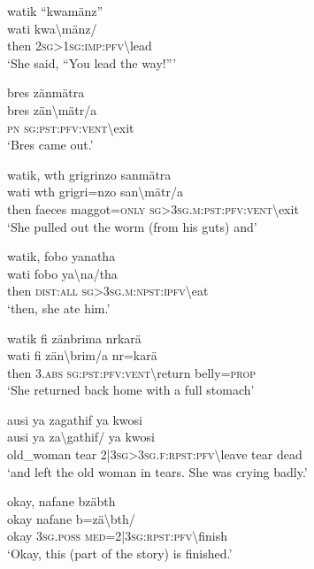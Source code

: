 \ea\label{ex:8:a1795}
watik ``kwamänz''\\
\gll wati	kwa{\textbackslash}mänz/\\
     then	2\textsc{sg}>1\textsc{sg}:\textsc{imp}:\textsc{pfv}{\textbackslash}lead\\
\glt `She said, ``You lead the way!'''
\z

\ea\label{ex:8:a1797}
bres zänmätra\\
\gll bres	zän{\textbackslash}mätr/a\\
     \textsc{pn}	\textsc{sg}:\textsc{pst}:\textsc{pfv}:\textsc{vent}{\textbackslash}exit\\
\glt `Bres came out.'
\z

\ea\label{ex:8:a1798}
watik, wth grigrinzo sanmätra\\
\gll wati	wth	grigri=nzo	san{\textbackslash}mätr/a\\
     then	faeces	maggot=\textsc{only}	\textsc{sg}>3\textsc{sg}.\textsc{m}:\textsc{pst}:\textsc{pfv}:\textsc{vent}{\textbackslash}exit\\
\glt `She pulled out the worm (from his guts) and'
\z

\ea\label{ex:8:a1799}
watik, fobo yanatha\\
\gll wati	fobo	ya{\textbackslash}na/tha\\
     then	\textsc{dist}:\textsc{all}	\textsc{sg}>3\textsc{sg}.\textsc{m}:\textsc{npst}:\textsc{ipfv}{\textbackslash}eat\\
\glt `then, she ate him.'
\z

\ea\label{ex:8:a1800}
watik fi zänbrima nrkarä\\
\gll wati	fi	zän{\textbackslash}brim/a	nr=karä\\
     then	3.\textsc{abs}	\textsc{sg}:\textsc{pst}:\textsc{pfv}:\textsc{vent}{\textbackslash}return	belly=\textsc{prop}\\
\glt `She returned back home with a full stomach'
\z

\ea\label{ex:8:a1801}
ausi ya zagathif ya kwosi\\
\gll ausi	ya	za{\textbackslash}gathif/	ya	kwosi\\
     old\_woman	tear	2|3\textsc{sg}>3\textsc{sg}.\textsc{f}:\textsc{rpst}:\textsc{pfv}{\textbackslash}leave	tear	dead\\
\glt `and left the old woman in tears. She was crying badly.'
\z

\ea\label{ex:8:a1803}
okay, nafane bzäbth\\
\gll okay	nafane	b=zä{\textbackslash}bth/\\
     okay	3\textsc{sg}.\textsc{poss}	\textsc{med}=2|3\textsc{sg}:\textsc{rpst}:\textsc{pfv}{\textbackslash}finish\\
\glt `Okay, this (part of the story) is finished.'
\z

